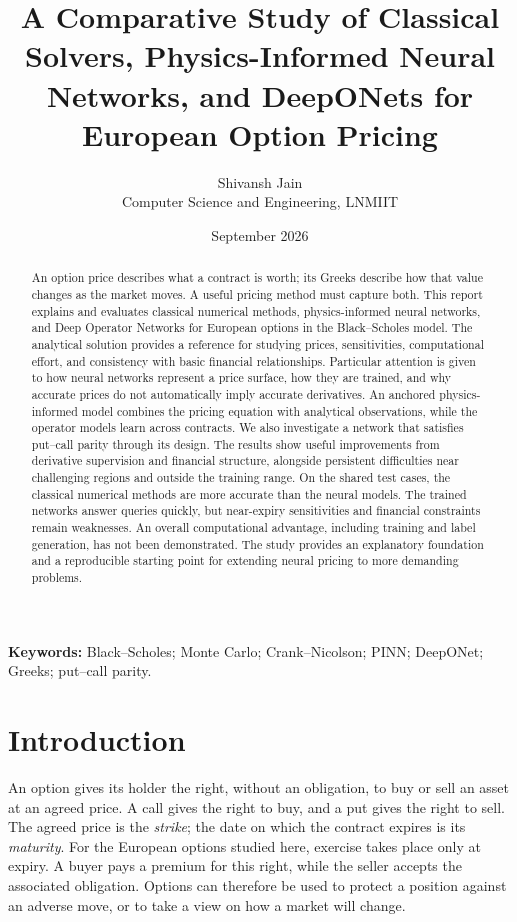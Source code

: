\documentclass[11pt,a4paper]{article}
\title{A Comparative Study of Classical Solvers, Physics-Informed Neural Networks, and DeepONets for European Option Pricing}
\author{Shivansh Jain\\Computer Science and Engineering, LNMIIT}
\date{September 2026}
\begin{document}
\maketitle
\begin{abstract}
An option price describes what a contract is worth; its Greeks describe how that value changes as the market moves. A useful pricing method must capture both. This report explains and evaluates classical numerical methods, physics-informed neural networks, and Deep Operator Networks for European options in the Black--Scholes model. The analytical solution provides a reference for studying prices, sensitivities, computational effort, and consistency with basic financial relationships. Particular attention is given to how neural networks represent a price surface, how they are trained, and why accurate prices do not automatically imply accurate derivatives. An anchored physics-informed model combines the pricing equation with analytical observations, while the operator models learn across contracts. We also investigate a network that satisfies put--call parity through its design. The results show useful improvements from derivative supervision and financial structure, alongside persistent difficulties near challenging regions and outside the training range. On the shared test cases, the classical numerical methods are more accurate than the neural models. The trained networks answer queries quickly, but near-expiry sensitivities and financial constraints remain weaknesses. An overall computational advantage, including training and label generation, has not been demonstrated. The study provides an explanatory foundation and a reproducible starting point for extending neural pricing to more demanding problems.

\end{abstract}
\noindent\textbf{Keywords:} Black--Scholes; Monte Carlo; Crank--Nicolson; PINN; DeepONet; Greeks; put--call parity.

\section{Introduction}
\label{sec:intro}
An option gives its holder the right, without an obligation, to buy or sell an asset at an agreed price. A call gives the right to buy, and a put gives the right to sell. The agreed price is the \emph{strike}; the date on which the contract expires is its \emph{maturity}. For the European options studied here, exercise takes place only at expiry. A buyer pays a premium for this right, while the seller accepts the associated obligation. Options can therefore be used to protect a position against an adverse move, or to take a view on how a market will change.
\end{document}
